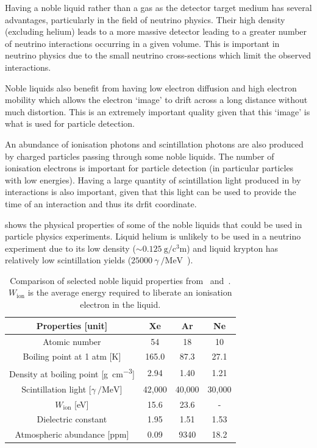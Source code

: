 Having a noble liquid rather than a gas as the detector target medium has several advantages, particularly in the field of neutrino physics.
Their high density (excluding helium) leads to a more massive detector leading to a greater number of neutrino interactions occurring in a given volume.
This is important in neutrino physics due to the small neutrino cross-sections which limit the observed interactions.

Noble liquids also benefit from having low electron diffusion and high electron mobility which allows the electron `image' to drift across a long distance without much distortion.
This is an extremely important quality given that this `image' is what is used for particle detection.

An abundance of ionisation photons and scintillation photons are also produced by charged particles passing through some noble liquids.
The number of ionisation electrons is important for particle detection (in particular particles with low energies).
Having a large quantity of scintillation light produced in by interactions is also important, given that this light can be used to provide the time of an interaction and thus its drfit coordinate.

 shows the physical properties of some of the noble liquids that could be used in particle physics experiments.
Liquid helium is unlikely to be used in a neutrino experiment due to its low density ($\sim \SI{0.125}{\gram\per\cubic\centi\metre}$) and liquid krypton has relatively low scintillation yields ($25000~\gamma~\si{\per\mega\electronvolt}$~\cite{uBooneProp}).

\begin{table}
  \caption[Comparison of selected noble liquid properties.]{Comparison of selected noble liquid properties from~\cite{uBooneProp} and~\cite{nobleLiquids}. $W_{\text{ion}}$ is the average energy required to liberate an ionisation electron in the liquid.}
  \label{tab:nobleLiquids}
  \centering
  \begin{tabular}{c c c c}
    \hline
    \textbf{Properties [unit]} & \textbf{Xe} & \textbf{Ar} & \textbf{Ne} \\
    \hline
    \hline
    Atomic number & 54 & 18 & 10 \\
    Boiling point at 1 atm [K] & 165.0 & 87.3 & 27.1 \\
    Density at boiling point [\si{\gram\per\cubic\centi\metre}] & 2.94 & 1.40 & 1.21 \\
    Scintillation light [$\gamma~\si{\per\mega\electronvolt}$] & 42,000 & 40,000 & 30,000 \\
    $W_{\text{ion}}$ [\si{\electronvolt}] & 15.6 & 23.6 & - \\
    Dielectric constant & 1.95 & 1.51 & 1.53 \\
    Atmospheric abundance [ppm] & 0.09 & 9340 & 18.2 \\
    \hline
  \end{tabular}
\end{table}

